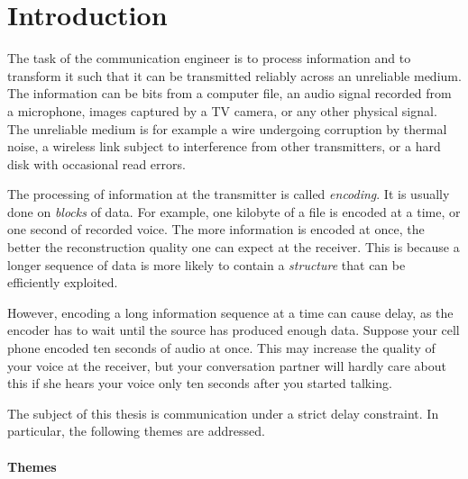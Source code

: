 \chapter*{Introduction}

The task of the communication engineer is to process information and to
transform it such that it can be transmitted reliably across an unreliable
medium. The information can be bits from a computer file, an audio signal
recorded from a microphone, images captured by a TV camera, or any other
physical signal. The unreliable medium is for example a wire undergoing
corruption by thermal noise, a wireless link subject to interference from other
transmitters, or a hard disk with occasional read errors.

The processing of information at the transmitter is called \emph{encoding}. It
is usually done on \emph{blocks} of data. For example, one kilobyte of a file is
encoded at a time, or one second of recorded voice. The more information is
encoded at once, the better the reconstruction quality one can expect at the
receiver. This is because a longer sequence of data is more likely to contain a
\emph{structure} that can be efficiently exploited. 

However, encoding a long information sequence at a time can cause delay, as the
encoder has to wait until the source has produced enough data. Suppose your cell
phone encoded ten seconds of audio at once. This may increase the quality of
your voice at the receiver, but your conversation partner will hardly care about
this if she hears your voice only ten seconds after you started talking.  

The subject of this thesis is communication under a strict delay constraint. In
particular, the following themes are addressed. 

\subsubsection{Themes}

